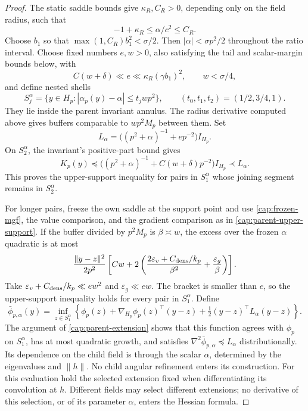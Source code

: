 \begin{proof}
The static saddle bounds give \(\kappa_R,C_R>0\), depending only on
the field radius, such that
\[
 -1+\kappa_R\le\alpha/c^2\le C_R.
\]
Choose \(b_1\) so that
\(\max(1,C_R)b_1^2<\sigma/2\). Then \(|\alpha|<\sigma p^2/2\)
throughout the ratio interval. Choose fixed numbers \(e,w>0\), also
satisfying the tail and scalar-margin bounds below, with
\[
 C(w+\delta)\ll e\ll\kappa_R(\gamma b_1)^2,
 \qquad w<\sigma/4,
\]
and define nested shells
\[
 S_j^\alpha=\{y\in H_p:|\alpha_p(y)-\alpha|\le t_jwp^2\},
 \qquad (t_0,t_1,t_2)=(1/2,3/4,1).
\]
They lie inside the parent invariant annulus. The radius derivative
computed above gives buffers comparable to \(wp^2M_p\) between them.
Set
\[
 L_\alpha=\bigl((p^2+\alpha)^{-1}+ep^{-2}\bigr)I_{H_p}.
\]
On \(S_2^\alpha\), the invariant's positive-part bound gives
\[
 K_p(y)\preceq
 \bigl((p^2+\alpha)^{-1}+C(w+\delta)p^{-2}\bigr)I_{H_p}
 \prec L_\alpha.
\]
This proves the upper-support inequality for pairs in \(S_1^\alpha\)
whose joining segment remains in \(S_2^\alpha\).

For longer pairs, freeze the own saddle at the support point and use
\eqref{cap:frozen-mgf}, the value comparison, and the gradient comparison
as in \eqref{cap:parent-upper-support}. If the buffer divided by
\(p^2M_p\) is \(\beta\asymp w\), the excess over the frozen
\(\alpha\) quadratic is at most
\[
 \frac{\|y-z\|^2}{2p^2}
 \left[Cw+
 2\left(\frac{2\varepsilon_v+C_{\rm dens}/k_p}{\beta^2}
               +\frac{\varepsilon_g}{\beta}\right)\right].
\]
Take \(\varepsilon_v+C_{\rm dens}/k_p\ll ew^2\) and
\(\varepsilon_g\ll ew\). The bracket is smaller than \(e\), so the
upper-support inequality holds for every pair in \(S_1^\alpha\).
Define
\[
 \bar\phi_{p,\alpha}(y)=\inf_{z\in S_1^\alpha}
 \left\{\phi_p(z)+\nabla_{H_p}\phi_p(z)^\top(y-z)
                   +\tfrac12(y-z)^\top L_\alpha(y-z)\right\}.
\]
The argument of \eqref{cap:parent-extension} shows that this function
agrees with \(\phi_p\) on \(S_1^\alpha\), has at most quadratic
growth, and satisfies \(\nabla^2\bar\phi_{p,\alpha}\preceq L_\alpha\)
distributionally. Its dependence on the child field is through the scalar
\(\alpha\), determined by the eigenvalues and \(\|h\|\). No child
angular refinement enters its construction. For this evaluation hold the
selected extension fixed when differentiating its convolution at \(h\).
Different fields may select different extensions; no derivative of this
selection, or of its parameter \(\alpha\), enters the Hessian formula.


\end{proof}
